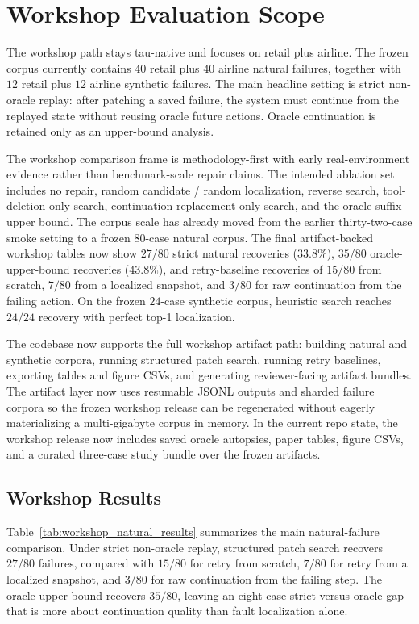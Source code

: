 \documentclass[11pt]{article}
\begin{document}
\section{Workshop Evaluation Scope}

The workshop path stays tau-native and focuses on retail plus airline. The
frozen corpus currently contains $40$ retail plus $40$ airline natural
failures, together with $12$ retail plus $12$ airline synthetic failures. The
main headline setting is strict non-oracle replay: after patching a saved
failure, the system must continue from the replayed state without reusing
oracle future actions. Oracle continuation is retained only as an upper-bound
analysis.

The workshop comparison frame is methodology-first with early real-environment
evidence rather than benchmark-scale repair claims. The intended ablation set
includes no repair, random candidate / random localization, reverse search,
tool-deletion-only search, continuation-replacement-only search, and the
oracle suffix upper bound. The corpus scale has already moved from the earlier
thirty-two-case smoke setting to a frozen $80$-case natural corpus. The final
artifact-backed workshop tables now show $27/80$ strict natural recoveries
($33.8\%$), $35/80$ oracle-upper-bound recoveries ($43.8\%$), and retry-baseline
recoveries of $15/80$ from scratch, $7/80$ from a localized snapshot, and
$3/80$ for raw continuation from the failing action. On the frozen $24$-case
synthetic corpus, heuristic search reaches $24/24$ recovery with perfect
top-1 localization.

The codebase now supports the full workshop artifact path: building natural and
synthetic corpora, running structured patch search, running retry baselines,
exporting tables and figure CSVs, and generating reviewer-facing artifact
bundles. The artifact layer now uses resumable JSONL outputs and sharded
failure corpora so the frozen workshop release can be regenerated without
eagerly materializing a multi-gigabyte corpus in memory. In the current repo
state, the workshop release now includes saved oracle autopsies, paper tables,
figure CSVs, and a curated three-case study bundle over the frozen artifacts.

\subsection*{Workshop Results}

Table~\ref{tab:workshop_natural_results} summarizes the main natural-failure
comparison. Under strict non-oracle replay, structured patch search recovers
$27/80$ failures, compared with $15/80$ for retry from scratch, $7/80$ for
retry from a localized snapshot, and $3/80$ for raw continuation from the
failing step. The oracle upper bound
recovers $35/80$, leaving an eight-case strict-versus-oracle gap that is more
about continuation quality than fault localization alone.
\end{document}

